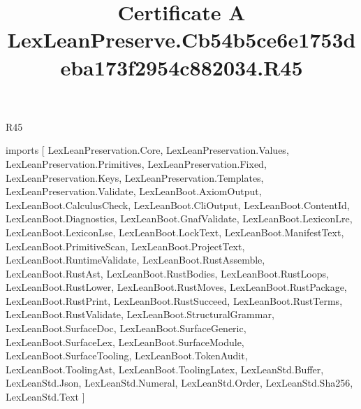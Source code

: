 \begin{lexlean}{R45}
\title{Certificate A LexLeanPreserve.Cb54b5ce6e1753deba173f2954c882034.R45}
\begin{coremodule}
imports [
  LexLeanPreservation.Core,
  LexLeanPreservation.Values,
  LexLeanPreservation.Primitives,
  LexLeanPreservation.Fixed,
  LexLeanPreservation.Keys,
  LexLeanPreservation.Templates,
  LexLeanPreservation.Validate,
  LexLeanBoot.AxiomOutput,
  LexLeanBoot.CalculusCheck,
  LexLeanBoot.CliOutput,
  LexLeanBoot.ContentId,
  LexLeanBoot.Diagnostics,
  LexLeanBoot.GnafValidate,
  LexLeanBoot.LexiconLre,
  LexLeanBoot.LexiconLse,
  LexLeanBoot.LockText,
  LexLeanBoot.ManifestText,
  LexLeanBoot.PrimitiveScan,
  LexLeanBoot.ProjectText,
  LexLeanBoot.RuntimeValidate,
  LexLeanBoot.RustAssemble,
  LexLeanBoot.RustAst,
  LexLeanBoot.RustBodies,
  LexLeanBoot.RustLoops,
  LexLeanBoot.RustLower,
  LexLeanBoot.RustMoves,
  LexLeanBoot.RustPackage,
  LexLeanBoot.RustPrint,
  LexLeanBoot.RustSucceed,
  LexLeanBoot.RustTerms,
  LexLeanBoot.RustValidate,
  LexLeanBoot.StructuralGrammar,
  LexLeanBoot.SurfaceDoc,
  LexLeanBoot.SurfaceGeneric,
  LexLeanBoot.SurfaceLex,
  LexLeanBoot.SurfaceModule,
  LexLeanBoot.SurfaceTooling,
  LexLeanBoot.TokenAudit,
  LexLeanBoot.ToolingAst,
  LexLeanBoot.ToolingLatex,
  LexLeanStd.Buffer,
  LexLeanStd.Json,
  LexLeanStd.Numeral,
  LexLeanStd.Order,
  LexLeanStd.Sha256,
  LexLeanStd.Text
]


\end{coremodule}
\end{lexlean}
